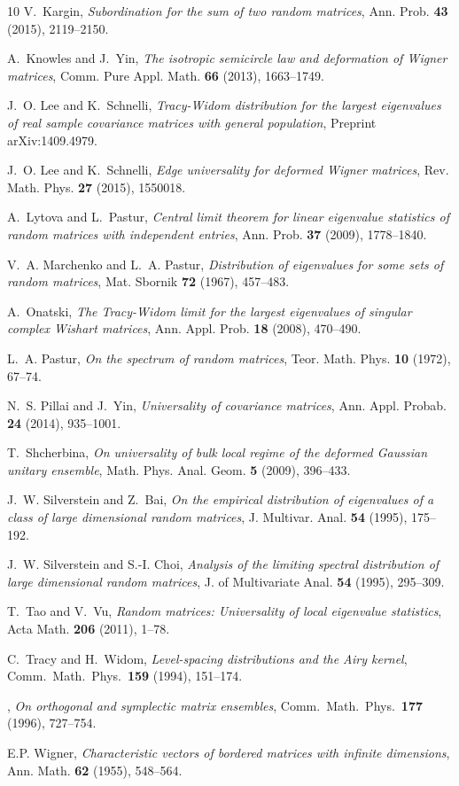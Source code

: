 \documentclass[11pt]{article} %
\numberwithin{equation}{section}
\numberwithin{figure}{section}
\theoremstyle{plain} %
\theoremstyle{definition} %
\begin{document}
{\begin{thebibliography}{10}
V.~Kargin, \emph{Subordination for the sum of two random matrices}, Ann. Prob.
  \textbf{43} (2015), 2119--2150.

A.~Knowles and J.~Yin, \emph{The isotropic semicircle law and deformation of
  {W}igner matrices}, Comm. Pure Appl. Math. \textbf{66} (2013), 1663--1749.

J.~O. Lee and K.~Schnelli, \emph{{T}racy-{W}idom distribution for the largest
  eigenvalues of real sample covariance matrices with general population},
  Preprint arXiv:1409.4979.

J.~O. Lee and K.~Schnelli, \emph{Edge universality for deformed {W}igner
  matrices}, Rev. Math. Phys. \textbf{27} (2015), 1550018.

A.~Lytova and L.~Pastur, \emph{Central limit theorem for linear eigenvalue
  statistics of random matrices with independent entries}, Ann. Prob.
  \textbf{37} (2009), 1778--1840.

V.~A. Marchenko and L.~A. Pastur, \emph{Distribution of eigenvalues for some
  sets of random matrices}, Mat. Sbornik \textbf{72} (1967), 457--483.

A.~Onatski, \emph{The {T}racy-{W}idom limit for the largest eigenvalues of
  singular complex {W}ishart matrices}, Ann. Appl. Prob. \textbf{18} (2008),
  470--490.

L.~A. Pastur, \emph{On the spectrum of random matrices}, Teor. Math. Phys.
  \textbf{10} (1972), 67--74.

N.~S. Pillai and J.~Yin, \emph{Universality of covariance matrices}, Ann. Appl.
  Probab. \textbf{24} (2014), 935--1001.

T.~Shcherbina, \emph{On universality of bulk local regime of the deformed
  {G}aussian unitary ensemble}, Math. Phys. Anal. Geom. \textbf{5} (2009),
  396--433.

J.~W. Silverstein and Z.~Bai, \emph{On the empirical distribution of
  eigenvalues of a class of large dimensional random matrices}, J. Multivar.
  Anal. \textbf{54} (1995), 175--192.

J.~W. Silverstein and S.-I. Choi, \emph{Analysis of the limiting spectral
  distribution of large dimensional random matrices}, J. of Multivariate Anal.
  \textbf{54} (1995), 295--309.

T.~Tao and V.~Vu, \emph{Random matrices: {U}niversality of local eigenvalue
  statistics}, Acta Math. \textbf{206} (2011), 1--78.

C.~Tracy and H.~Widom, \emph{Level-spacing distributions and the {A}iry
  kernel}, Comm.\ Math.\ Phys.\ \textbf{159} (1994), 151--174.

\bysame, \emph{On orthogonal and symplectic matrix ensembles}, Comm.\ Math.\
  Phys.\ \textbf{177} (1996), 727--754.

E.P. Wigner, \emph{Characteristic vectors of bordered matrices with infinite
  dimensions}, Ann. Math. \textbf{62} (1955), 548--564.

\end{thebibliography}
}
\end{document}
